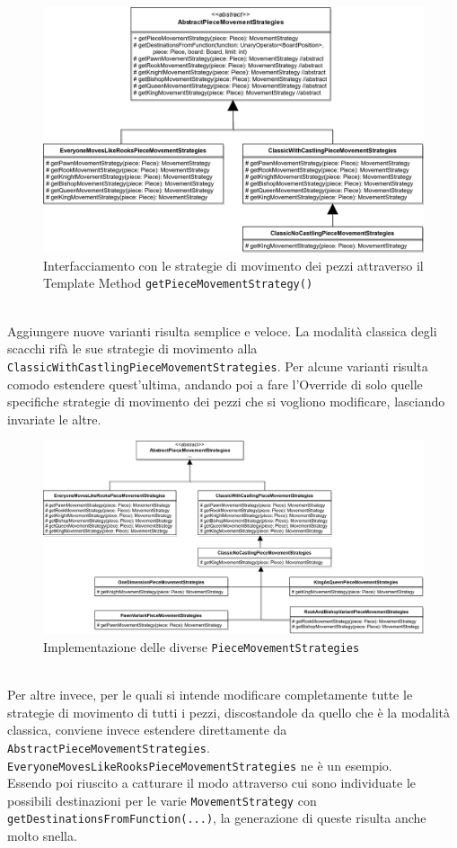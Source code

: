 \documentclass[a4paper,12pt]{report}
\begin{document}
\begin{figure}[H]
\centering{}
\includegraphics[width=\textwidth]{img/Stefano/TemplateMethodPieceMovementStrategies}
\caption{Interfacciamento con le strategie di movimento dei pezzi attraverso il Template Method \texttt{getPieceMovementStrategy()}}
\label{img:TemplateMethodPieceMovementStrategies}
\end{figure}
%
\
\\
Aggiungere nuove varianti risulta semplice e veloce. La modalità classica degli scacchi rifà le sue strategie di movimento alla \texttt{ClassicWithCastlingPieceMovementStrategies}.
Per alcune varianti risulta comodo estendere quest'ultima, andando poi a fare l'Override di solo quelle specifiche strategie di movimento dei pezzi che si vogliono modificare, lasciando invariate le altre. 

\begin{figure}[H]
\centering{}
\includegraphics[width=\textwidth]{img/Stefano/PieceMovementStrategiesFocus.png}
\caption{Implementazione delle diverse \texttt{PieceMovementStrategies}}
\label{img:PieceMovementStrategiesFocus}
\end{figure}
\
\\
%
Per altre invece, per le quali si intende modificare completamente tutte le strategie di movimento di tutti i pezzi, discostandole da quello che è la modalità classica, conviene invece estendere direttamente da \texttt{AbstractPieceMovementStrategies}.\\
\texttt{EveryoneMovesLikeRooksPieceMovementStrategies} ne è un esempio.
\\
Essendo poi riuscito a catturare il modo attraverso cui sono individuate le possibili destinazioni per le varie \texttt{MovementStrategy} con \texttt{getDestinationsFromFunction(...)}, la generazione di queste risulta anche molto snella.
\end{document}
